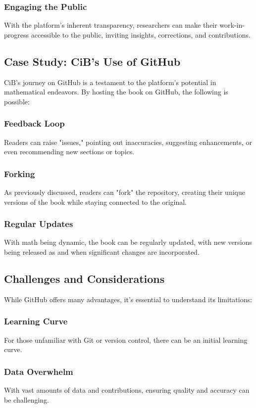 \documentclass[a4paper,12pt]{book}
\begin{document}
\subsubsection*{Engaging the Public}
With the platform's inherent transparency, researchers can make their work-in-progress accessible to the public, inviting insights, corrections, and contributions.

\subsection*{Case Study: CiB's Use of GitHub}
CiB's journey on GitHub is a testament to the platform's potential in mathematical endeavors. By hosting the book on GitHub, the following is possible:

\subsubsection*{Feedback Loop}
Readers can raise "issues," pointing out inaccuracies, suggesting enhancements, or even recommending new sections or topics.

\subsubsection*{Forking}
As previously discussed, readers can "fork" the repository, creating their unique versions of the book while staying connected to the original.

\subsubsection*{Regular Updates}
With math being dynamic, the book can be regularly updated, with new versions being released as and when significant changes are incorporated.

\subsection*{Challenges and Considerations}
While GitHub offers many advantages, it's essential to understand its limitations:

\subsubsection*{Learning Curve}
For those unfamiliar with Git or version control, there can be an initial learning curve.

\subsubsection*{Data Overwhelm}
With vast amounts of data and contributions, ensuring quality and accuracy can be challenging.
\end{document}
